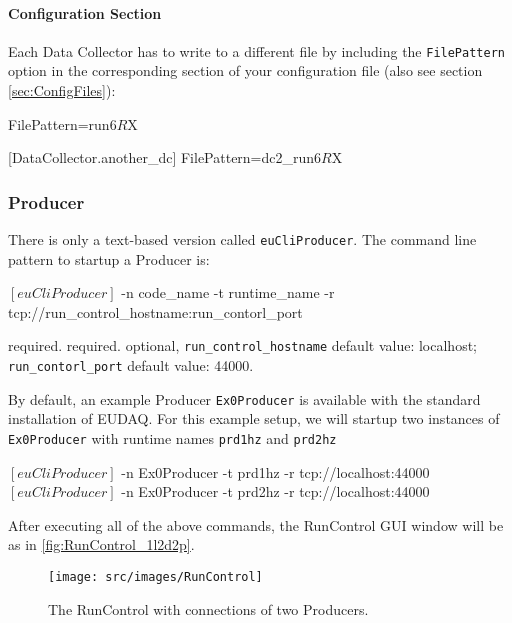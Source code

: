 \paragraph{Configuration Section}
Each Data Collector has to write to a different file by including the
\texttt{FilePattern} option in the corresponding section of your
configuration file (also see section \ref{sec:ConfigFiles}):

\begin{listing}[conf]
[DataCollector.my_dc]
FilePattern=run$6R$X

[DataCollector.another_dc]
FilePattern=dc2_run$6R$X
\end{listing}


\subsubsection{Producer}
\label{sec:testproducer}
There is only a text-based version called \texttt{euCliProducer}.
The command line pattern to startup a Producer is:
\begin{listing}[mybash]
$[euCliProducer]$ -n {code_name} -t {runtime_name} -r tcp://{run_control_hostname}:{run_contorl_port}
\end{listing}

\begin{description}
required.
required.
optional, \texttt{run\_control\_hostname} default value: localhost;  \texttt{run\_contorl\_port}  default value: 44000.
\end{description}

By default, an example Producer \texttt{Ex0Producer} is available with the standard installation of EUDAQ.
For this example setup, we will startup two instances of \texttt{Ex0Producer} with runtime names \texttt{prd1hz} and \texttt{prd2hz}\\
\begin{listing}[mybash]
$[euCliProducer]$ -n Ex0Producer -t prd1hz -r tcp://localhost:44000
$[euCliProducer]$ -n Ex0Producer -t prd2hz -r tcp://localhost:44000
\end{listing}


After executing all of the above commands, the RunControl GUI window will be as in \autoref{fig:RunControl_1l2d2p}.

\begin{figure}[htb]
  \begin{center}
    \texttt{[image: src/images/RunControl]}
    \caption{The RunControl with connections of two Producers.}
    \label{fig:RunControl_1l2d2p}
  \end{center}
\end{figure}

